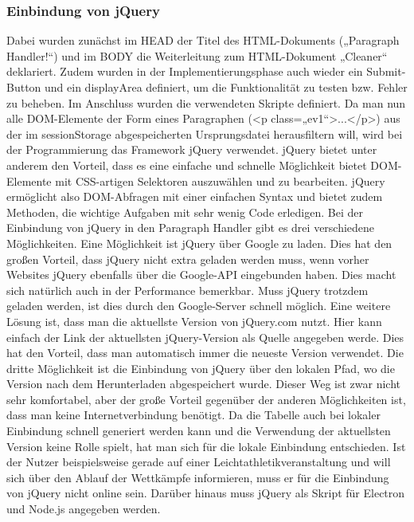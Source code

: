 {\subsubsection{Einbindung von jQuery}
Dabei wurden zunächst im HEAD der Titel des HTML-Dokuments („Paragraph Handler!“) und im BODY die Weiterleitung zum HTML-Dokument „Cleaner“ deklariert. Zudem wurden in der Implementierungsphase auch wieder ein Submit-Button und ein displayArea definiert, um die Funktionalität zu testen bzw. Fehler zu beheben. Im Anschluss wurden die verwendeten Skripte definiert. Da man nun alle DOM-Elemente der Form eines Paragraphen (<p class=„ev1“>...</p>) aus der im sessionStorage abgespeicherten Ursprungsdatei herausfiltern will, wird bei der Programmierung das Framework jQuery verwendet. jQuery bietet unter anderem den Vorteil, dass es eine einfache und schnelle Möglichkeit bietet DOM-Elemente mit CSS-artigen Selektoren auszuwählen und zu bearbeiten. jQuery ermöglicht also DOM-Abfragen mit einer einfachen Syntax und bietet zudem Methoden, die wichtige Aufgaben mit sehr wenig Code erledigen. Bei der Einbindung von jQuery in den Paragraph Handler gibt es drei verschiedene Möglichkeiten. Eine Möglichkeit ist jQuery über Google zu laden. Dies hat den großen Vorteil, dass jQuery nicht extra geladen werden muss, wenn vorher Websites jQuery ebenfalls über die Google-API eingebunden haben. Dies macht sich natürlich auch in der Performance bemerkbar. Muss jQuery trotzdem geladen werden, ist dies durch den Google-Server schnell möglich. Eine weitere Lösung ist, dass man die aktuellste Version von jQuery.com nutzt. Hier kann einfach der Link der aktuellsten jQuery-Version als Quelle angegeben werde. Dies hat den Vorteil, dass man automatisch immer die neueste Version verwendet. Die dritte Möglichkeit ist die Einbindung von jQuery über den lokalen Pfad, wo die Version nach dem Herunterladen abgespeichert wurde. Dieser Weg ist zwar nicht sehr komfortabel, aber der große Vorteil gegenüber der anderen Möglichkeiten ist, dass man keine Internetverbindung benötigt. Da die Tabelle auch bei lokaler Einbindung schnell generiert werden kann und die Verwendung der aktuellsten Version keine Rolle spielt, hat man sich für die lokale Einbindung entschieden. Ist der Nutzer beispielsweise gerade auf einer Leichtathletikveranstaltung und will sich über den Ablauf der Wettkämpfe informieren, muss er für die Einbindung von jQuery nicht online sein. 
Darüber hinaus muss jQuery als Skript für Electron und Node.js angegeben werden. 

}
